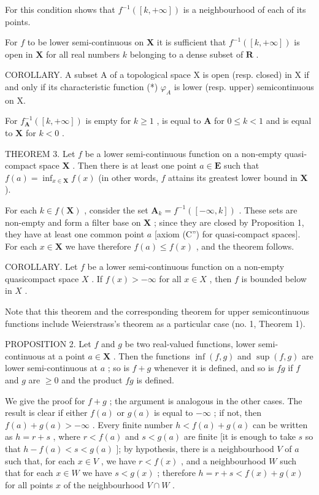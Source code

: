 For this condition shows that \(f^{-1}([k, +\infty])\) is a neighbourhood of each of its points.

For \(f\) to be lower semi-continuous on \(\mathbf{X}\) it is sufficient that \(f^{-1}([k, +\infty])\) is open in \(\mathbf{X}\) for all real numbers \(k\) belonging to a dense subset of \(\mathbf{R}\) .

COROLLARY. A subset A of a topological space X is open (resp. closed) in X if and only if its characteristic function (*) \(\varphi_{A}\) is lower (resp. upper) semicontinuous on X.

For \(f_{\mathbf{A}}^{-1}([k, +\infty])\) is empty for \(k \geqslant 1\) , is equal to \(\mathbf{A}\) for \(0 \leqslant k < 1\) and is equal to \(\mathbf{X}\) for \(k < 0\) .

THEOREM 3. Let \(f\) be a lower semi-continuous function on a non-empty quasi-compact space \(\mathbf{X}\) . Then there is at least one point \(a \in \mathbf{E}\) such that \(f(a) = \inf_{x \in \mathbf{X}} f(x)\) (in other words, \(f\) attains its greatest lower bound in \(\mathbf{X}\) ).

For each \(k \in f(\mathbf{X})\) , consider the set \(\mathbf{A}_k = f^{-1}([-\infty, k])\) . These sets are non-empty and form a filter base on \(\mathbf{X}\) ; since they are closed by Proposition 1, they have at least one common point \(a\) {[}axiom (C'') for quasi-compact spaces{]}. For each \(x \in \mathbf{X}\) we have therefore \(f(a) \leqslant f(x)\) , and the theorem follows.

COROLLARY. Let \(f\) be a lower semi-continuous function on a non-empty quasicompact space \(X\) . If \(f(x) > -\infty\) for all \(x \in X\) , then \(f\) is bounded below in \(X\) .

Note that this theorem and the corresponding theorem for upper semicontinuous functions include Weierstrass's theorem as a particular case (no. 1, Theorem 1).

PROPOSITION 2. Let \(f\) and \(g\) be two real-valued functions, lower semi-continuous at a point \(a \in \mathbf{X}\) . Then the functions \(\inf(f, g)\) and \(\sup(f, g)\) are lower semi-continuous at \(a\) ; so is \(f + g\) whenever it is defined, and so is \(fg\) if \(f\) and \(g\) are \(\geqslant 0\) and the product \(fg\) is defined.

We give the proof for \(f + g\) ; the argument is analogous in the other cases. The result is clear if either \(f(a)\) or \(g(a)\) is equal to \(-\infty\) ; if not, then \(f(a) + g(a) > -\infty\) . Every finite number \(h < f(a) + g(a)\) can be written as \(h = r + s\) , where \(r < f(a)\) and \(s < g(a)\) are finite {[}it is enough to take \(s\) so that \(h - f(a) < s < g(a)\) {]}; by hypothesis, there is a neighbourhood \(V\) of \(a\) such that, for each \(x \in V\) , we have \(r < f(x)\) , and a neighbourhood \(W\) such that for each \(x \in W\) we have \(s < g(x)\) ; therefore \(h = r + s < f(x) + g(x)\) for all points \(x\) of the neighbourhood \(V \cap W\) .

